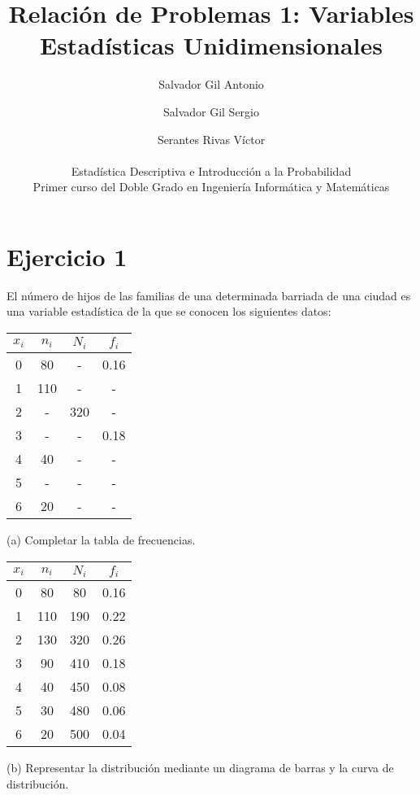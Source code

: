 \documentclass[a4paper,12pt]{article}
\title{Relación de Problemas 1: Variables Estadísticas Unidimensionales}
\author{Salvador Gil Antonio \and Salvador Gil Sergio \and Serantes Rivas Víctor\\\\Estadística Descriptiva e Introducción a la Probabilidad \\ Primer curso del Doble Grado en Ingeniería Informática y Matemáticas}
\date{}
\begin{document}
\maketitle
\section*{Ejercicio 1} El número de hijos de las familias de una determinada barriada de una ciudad es una variable estadística de la que se conocen los siguientes datos: 

\begin{center}
    \begin{tabular}{c|c|c|c}
        $x_i$ & $n_i$ & $N_i$ & $f_i$ \\
        \hline
        0 & 80 & - & 0.16 \\
        1 & 110 & - & - \\
        2 & - & 320 & - \\
        3 & -  & - & 0.18 \\
        4 & 40 &  - & - \\
        5 & -  & - & - \\
        6 & 20 &  - & -\\
    \end{tabular}
\end{center}

(a) Completar la tabla de frecuencias.\\
\begin{center}
    \begin{tabular}{c|c|c|c}
        $x_i$ & $n_i$ & $N_i$ & $f_i$ \\
        \hline
        0 & 80 & 80 & 0.16 \\
        1 & 110 & 190 & 0.22  \\
        2 & 130 & 320 & 0.26  \\
        3 & 90 & 410  & 0.18 \\
        4 & 40 & 450 & 0.08  \\
        5 & 30 & 480 & 0.06  \\
        6 & 20 & 500 & 0.04  \\
    \end{tabular}
\end{center}

(b) Representar la distribución mediante un diagrama de barras y la curva de distribución.\\
\end{document}
